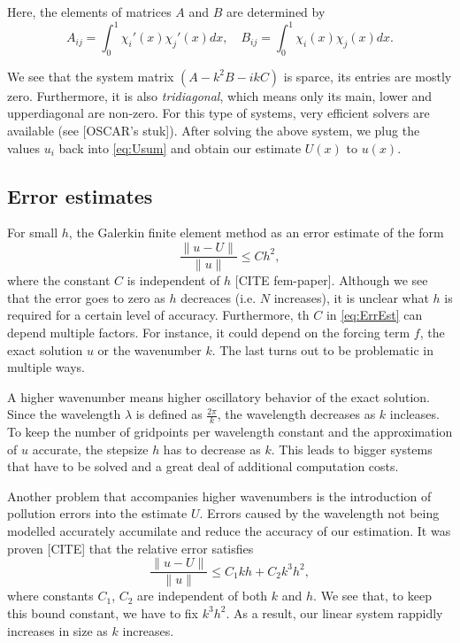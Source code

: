 \documentclass[a4paper]{article}
\begin{document}
Here, the elements of matrices $A$ and $B$ are determined by
\begin{equation}
  A_{i j} = \int^1_0 \chi_i'(x) \chi_j'(x) dx, \quad
  B_{i j} = \int^1_0 \chi_i(x) \chi_j(x) dx.
\end{equation}

We see that the system matrix $(A - k^2 B - i k C)$ is sparce, its
entries are mostly zero. Furthermore, it is also \emph{tridiagonal},
which means only its main, lower and upperdiagonal are non-zero. For
this type of systems, very efficient solvers are available (see
[OSCAR's stuk]). After solving the above system, we plug the values
$u_i$ back into \eqref{eq:Usum} and obtain our estimate $U(x)$ to
$u(x)$.

\subsection{Error estimates}

For small $h$, the Galerkin finite element method as an error estimate
of the form
\begin{equation} \label{eq:ErrEst}
  \frac{\lVert u - U \rVert}{\lVert u \rVert} \leq C h^2,
\end{equation}
where the constant $C$ is independent of $h$ \cite{}[CITE fem-paper].
Although we see that the error goes to zero as $h$ decreaces (i.e. $N$
increases), it is unclear what $h$ is required for a certain level of
accuracy. Furthermore, th $C$ in \eqref{eq:ErrEst} can depend multiple
factors. For instance, it could depend on the forcing term $f$, the
exact solution $u$ or the wavenumber $k$. The last turns out to be
problematic in multiple ways.

A higher wavenumber means higher oscillatory behavior of the exact
solution. Since the wavelength $\lambda$ is defined as
$\frac{2\pi}{k}$, the wavelength decreases as $k$ incleases. To keep
the number of gridpoints per wavelength constant and the approximation
of $u$ accurate, the stepsize $h$ has to decrease as $k$. This leads
to bigger systems that have to be solved and a great deal of
additional computation costs.

Another problem that accompanies higher wavenumbers is the
introduction of pollution errors into the estimate $U$. Errors caused
by the wavelength not being modelled accurately accumilate and reduce
the accuracy of our estimation. It was proven [CITE] that the relative
error satisfies
\begin{equation} \label{eq:ErrEstK}
  \frac{\lVert u - U \rVert}{\lVert u \rVert} \leq C_1 k h + C_2 k^3
  h^2,
\end{equation}
where constants $C_1$, $C_2$ are independent of both $k$ and $h$. We
see that, to keep this bound constant, we have to fix $k^3 h^2$. As a
result, our linear system rappidly increases in size as $k$ increases.
\end{document}

